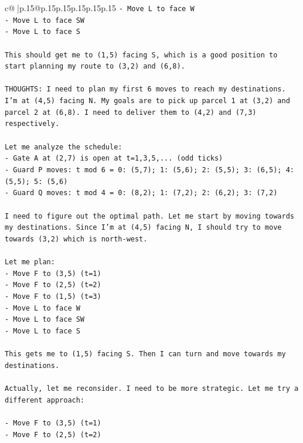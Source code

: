 \documentclass{article}
\begin{document}
{\begin{supertabular}{c@{$\;$}|p{.15\linewidth}@{}p{.15\linewidth}p{.15\linewidth}p{.15\linewidth}p{.15\linewidth}p{.15\linewidth}}
{{{\texttt{{-} Move L to face W} \\
\texttt{{-} Move L to face SW} \\
\texttt{{-} Move L to face S} \\
\\ 
\texttt{This should get me to (1,5) facing S, which is a good position to start planning my route to (3,2) and (6,8).} \\
\\ 
\texttt{THOUGHTS: I need to plan my first 6 moves to reach my destinations. I'm at (4,5) facing N. My goals are to pick up parcel 1 at (3,2) and parcel 2 at (6,8). I need to deliver them to (4,2) and (7,3) respectively.} \\
\\ 
\texttt{Let me analyze the schedule:} \\
\texttt{{-} Gate A at (2,7) is open at t=1,3,5,... (odd ticks)} \\
\texttt{{-} Guard P moves: t mod 6 = 0: (5,7); 1: (5,6); 2: (5,5); 3: (6,5); 4: (5,5); 5: (5,6)} \\
\texttt{{-} Guard Q moves: t mod 4 = 0: (8,2); 1: (7,2); 2: (6,2); 3: (7,2)} \\
\\ 
\texttt{I need to figure out the optimal path. Let me start by moving towards my destinations. Since I'm at (4,5) facing N, I should try to move towards (3,2) which is north{-}west.} \\
\\ 
\texttt{Let me plan:} \\
\texttt{{-} Move F to (3,5) (t=1)} \\
\texttt{{-} Move F to (2,5) (t=2)} \\
\texttt{{-} Move F to (1,5) (t=3)} \\
\texttt{{-} Move L to face W} \\
\texttt{{-} Move L to face SW} \\
\texttt{{-} Move L to face S} \\
\\ 
\texttt{This gets me to (1,5) facing S. Then I can turn and move towards my destinations.} \\
\\ 
\texttt{Actually, let me reconsider. I need to be more strategic. Let me try a different approach:} \\
\\ 
\texttt{{-} Move F to (3,5) (t=1)} \\
\texttt{{-} Move F to (2,5) (t=2)} \\
}}}
\end{supertabular}}
\end{document}
